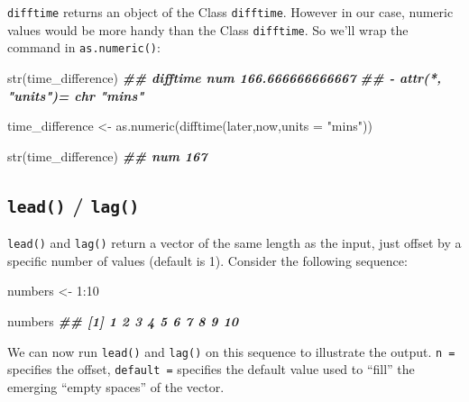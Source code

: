 \documentclass[
]{book}
\newenvironment{Shaded}{\begin{snugshade}}{\end{snugshade}}
\newcommand{\AttributeTok}[1]{\textcolor[rgb]{0.77,0.63,0.00}{#1}}
\newcommand{\DecValTok}[1]{\textcolor[rgb]{0.00,0.00,0.81}{#1}}
\newcommand{\DocumentationTok}[1]{\textcolor[rgb]{0.56,0.35,0.01}{\textbf{\textit{#1}}}}
\newcommand{\FunctionTok}[1]{\textcolor[rgb]{0.00,0.00,0.00}{#1}}
\newcommand{\NormalTok}[1]{#1}
\newcommand{\OtherTok}[1]{\textcolor[rgb]{0.56,0.35,0.01}{#1}}
\newcommand{\SpecialCharTok}[1]{\textcolor[rgb]{0.00,0.00,0.00}{#1}}
\newcommand{\StringTok}[1]{\textcolor[rgb]{0.31,0.60,0.02}{#1}}
\begin{document}
\texttt{difftime} returns an object of the Class \texttt{difftime}. However in our case, numeric values would be more handy than the Class \texttt{difftime}. So we'll wrap the command in \texttt{as.numeric()}:

\begin{Shaded}
\begin{Highlighting}[]
\FunctionTok{str}\NormalTok{(time\_difference)}
\DocumentationTok{\#\#  \textquotesingle{}difftime\textquotesingle{} num 166.666666666667}
\DocumentationTok{\#\#  {-} attr(*, "units")= chr "mins"}
\end{Highlighting}
\end{Shaded}

\begin{Shaded}
\begin{Highlighting}[]
\NormalTok{time\_difference }\OtherTok{\textless{}{-}} \FunctionTok{as.numeric}\NormalTok{(}\FunctionTok{difftime}\NormalTok{(later,now,}\AttributeTok{units =} \StringTok{"mins"}\NormalTok{))}

\FunctionTok{str}\NormalTok{(time\_difference)}
\DocumentationTok{\#\#  num 167}
\end{Highlighting}
\end{Shaded}

\hypertarget{lead-lag}{%
\subsection{\texorpdfstring{\texttt{lead()} / \texttt{lag()}}{lead() / lag()}}\label{lead-lag}}

\texttt{lead()} and \texttt{lag()} return a vector of the same length as the input, just offset by a specific number of values (default is 1). Consider the following sequence:

\begin{Shaded}
\begin{Highlighting}[]
\NormalTok{numbers }\OtherTok{\textless{}{-}} \DecValTok{1}\SpecialCharTok{:}\DecValTok{10}

\NormalTok{numbers}
\DocumentationTok{\#\#  [1]  1  2  3  4  5  6  7  8  9 10}
\end{Highlighting}
\end{Shaded}

We can now run \texttt{lead()} and \texttt{lag()} on this sequence to illustrate the output. \texttt{n\ =} specifies the offset, \texttt{default\ =} specifies the default value used to ``fill'' the emerging ``empty spaces'' of the vector.
\end{document}
